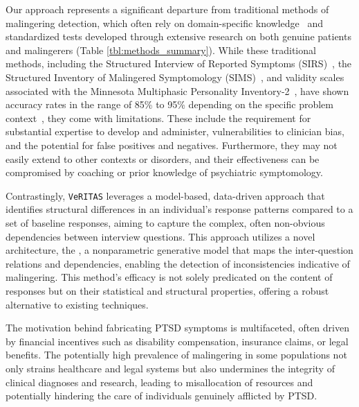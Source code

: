 \documentclass[onecolumn,10pt]{IEEEtran}
\def\vrts{\texttt{VeRITAS}\xspace}
\begin{document}
Our approach represents a significant departure from traditional methods of malingering detection, which often rely on domain-specific knowledge~\cite{walczyk2018review} and standardized tests developed through extensive research on both genuine patients and malingerers (Table \ref{tbl:methods_summary}). While these traditional methods, including the Structured Interview of Reported Symptoms (SIRS)~\cite{Wong2005}, the Structured Inventory of Malingered Symptomology (SIMS)~\cite{smith1997detection}, and validity scales associated with the Minnesota Multiphasic Personality Inventory-2~\cite{ben2012interpreting}, have shown accuracy rates in the range of 85\% to 95\% depending on the specific problem context~\cite{rogers2008determinations,sartori2008accurately,gregg2007vying,monaro2017detection}, they come with limitations. These include the requirement for substantial expertise to develop and administer, vulnerabilities to clinician bias, and the potential for false positives and negatives. Furthermore, they may not easily extend to other contexts or disorders, and their effectiveness can be compromised by coaching or prior knowledge of psychiatric symptomology.

Contrastingly, \vrts leverages a model-based, data-driven approach that identifies structural differences in an individual's response patterns compared to a set of baseline responses, aiming to capture the complex, often non-obvious dependencies between interview questions. This approach utilizes a novel architecture, the \qnet, a nonparametric generative model that maps the inter-question relations and dependencies, enabling the detection of inconsistencies indicative of malingering. This method's efficacy is not solely predicated on the content of responses but on their statistical and structural properties, offering a robust alternative to existing techniques.

The motivation behind fabricating PTSD symptoms is multifaceted, often driven by financial incentives such as disability compensation, insurance claims, or legal benefits. %
The potentially high prevalence of malingering in some populations  not only strains healthcare and legal systems but also undermines the integrity of clinical diagnoses and research, leading to misallocation of resources and potentially hindering the care of individuals genuinely afflicted by PTSD.
\end{document}
